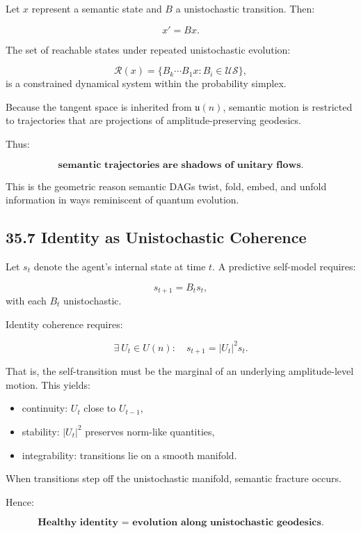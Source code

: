 \documentclass[12pt,letterpaper]{article}
\theoremstyle{remark}
\begin{document}
Let $x$ represent a semantic state and $B$ a unistochastic transition. Then:

\[
x' = Bx.
\]

The set of reachable states under repeated unistochastic evolution:

\[
\mathcal{R}(x) = \{ B_k \cdots B_1 x : B_i \in \mathcal{U\!S} \},
\]
is a constrained dynamical system within the probability simplex.

Because the tangent space is inherited from $\mathfrak{u}(n)$, semantic motion is restricted to trajectories that are projections of amplitude-preserving geodesics.

Thus:

\[
\textbf{semantic trajectories are shadows of unitary flows}.
\]

This is the geometric reason semantic DAGs twist, fold, embed, and unfold information in ways reminiscent of quantum evolution.

\subsection{35.7 Identity as Unistochastic Coherence}

Let $s_t$ denote the agent’s internal state at time $t$. A predictive self-model requires:

\[
s_{t+1} = B_t s_t,
\]
with each $B_t$ unistochastic.

Identity coherence requires:

\[
\exists \ U_t \in U(n): \quad s_{t+1} = |U_t|^2 s_t.
\]

That is, the self-transition must be the marginal of an underlying amplitude-level motion. This yields:

\begin{itemize}
    \item continuity: $U_t$ close to $U_{t-1}$,
    \item stability: $|U_t|^2$ preserves norm-like quantities,
    \item integrability: transitions lie on a smooth manifold.
\end{itemize}

When transitions step off the unistochastic manifold, semantic fracture occurs.

Hence:

\[
\textbf{Healthy identity = evolution along unistochastic geodesics.}
\]
\end{document}
